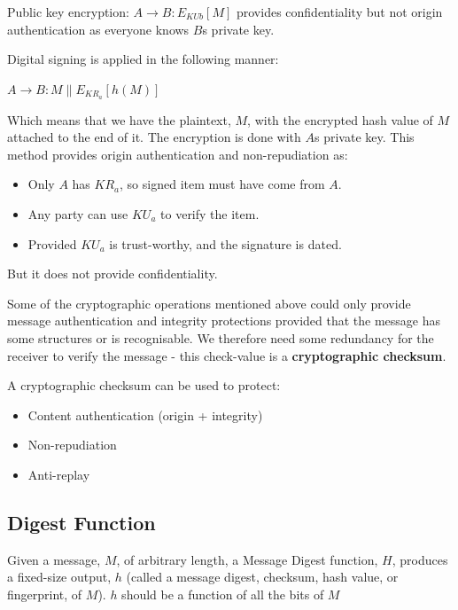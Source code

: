 \documentclass{article}
\begin{document}
Public key encryption: $A \rightarrow B: E_{KUb}[M]$ provides confidentiality but not origin authentication as everyone knows $B$s private key.

Digital signing is applied in the following manner:
\begin{center}
  $A \rightarrow B: M \| E_{KR_{a}}[h(M)]$
\end{center}
Which means that we have the plaintext, $M$, with the encrypted hash value of $M$ attached to the end of it. The encryption is done with $A$s private key. This method provides origin authentication and non-repudiation as:
\begin{itemize}
  \item Only $A$ has $KR_{a}$, so signed item must have come from $A$.
  \item Any party can use $KU_{a}$ to verify the item.
  \item Provided $KU_{a}$ is trust-worthy, and the signature is dated.
\end{itemize}
But it does not provide confidentiality.

Some of the cryptographic operations mentioned above could only provide message authentication and integrity protections provided that the message has some structures or is recognisable. We therefore need some redundancy for the receiver to verify the message - this check-value is a \textbf{cryptographic checksum}.

A cryptographic checksum can be used to protect:
\begin{itemize}
  \item Content authentication (origin + integrity)
  \item Non-repudiation
  \item Anti-replay
\end{itemize}

\subsection{Digest Function}
Given a message, $M$, of arbitrary length, a Message Digest function, $H$, produces a fixed-size output, $h$ (called a message digest, checksum, hash value, or fingerprint, of $M$). $h$ should be a function of all the bits of $M$
\end{document}
